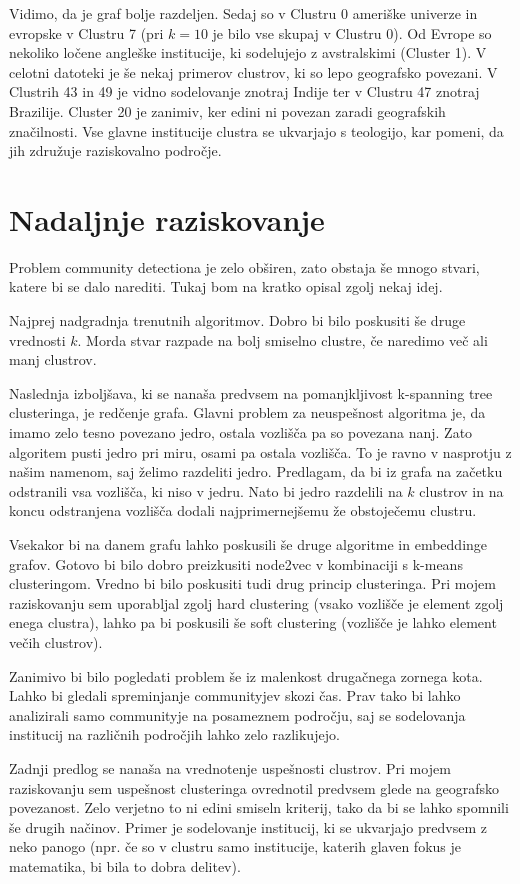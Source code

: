 \documentclass[a4paper,12pt]{article}
\begin{document}
	Vidimo, da je graf bolje razdeljen. Sedaj so v Clustru 0 ameriške univerze in evropske v Clustru 7 (pri $k=10$ je bilo vse skupaj v Clustru 0). Od Evrope so nekoliko ločene angleške institucije, ki sodelujejo z avstralskimi (Cluster 1). V celotni datoteki je še nekaj primerov clustrov, ki so lepo geografsko povezani. V Clustrih 43 in 49 je vidno sodelovanje znotraj Indije ter v Clustru 47 znotraj Brazilije. Cluster 20 je zanimiv, ker edini ni povezan zaradi geografskih značilnosti. Vse glavne institucije clustra se ukvarjajo s teologijo, kar pomeni, da jih združuje raziskovalno področje. 
	
	\section{Nadaljnje raziskovanje}
	
	Problem community detectiona je zelo obširen, zato obstaja še mnogo stvari, katere bi se dalo narediti. Tukaj bom na kratko opisal zgolj nekaj idej.
	
	Najprej nadgradnja trenutnih algoritmov. Dobro bi bilo poskusiti še druge vrednosti $k$. Morda stvar razpade na bolj smiselno clustre, če naredimo več ali manj clustrov.
	
	Naslednja izboljšava, ki se nanaša predvsem na pomanjkljivost k-spanning tree clusteringa, je redčenje grafa. Glavni problem za neuspešnost algoritma je, da imamo zelo tesno povezano jedro, ostala vozlišča pa so povezana nanj. Zato algoritem pusti jedro pri miru, osami pa ostala vozlišča. To je ravno v nasprotju z našim namenom, saj želimo razdeliti jedro. Predlagam, da bi iz grafa na začetku odstranili vsa vozlišča, ki niso v jedru. Nato bi jedro razdelili na $k$ clustrov in na koncu odstranjena vozlišča dodali najprimernejšemu že obstoječemu clustru. 
	
	Vsekakor bi na danem grafu lahko poskusili še druge algoritme in embeddinge grafov. Gotovo bi bilo dobro preizkusiti node2vec v kombinaciji s k-means clusteringom. Vredno bi bilo poskusiti tudi drug princip clusteringa. Pri mojem raziskovanju sem uporabljal zgolj hard clustering (vsako vozlišče je element zgolj enega clustra), lahko pa bi poskusili še soft clustering (vozlišče je lahko element večih clustrov).
	
	Zanimivo bi bilo pogledati problem še iz malenkost drugačnega zornega kota. Lahko bi gledali spreminjanje communityjev skozi čas. Prav tako bi lahko analizirali samo communityje na posameznem področju, saj se sodelovanja institucij na različnih področjih lahko zelo razlikujejo. 
		
	Zadnji predlog se nanaša na vrednotenje uspešnosti clustrov. Pri mojem raziskovanju sem uspešnost clusteringa ovrednotil predvsem glede na geografsko povezanost. Zelo verjetno to ni edini smiseln kriterij, tako da bi se lahko spomnili še drugih načinov. Primer je sodelovanje institucij, ki se ukvarjajo predvsem z neko panogo (npr. če so v clustru samo institucije, katerih glaven fokus je matematika, bi bila to dobra delitev).
		
\end{document}

